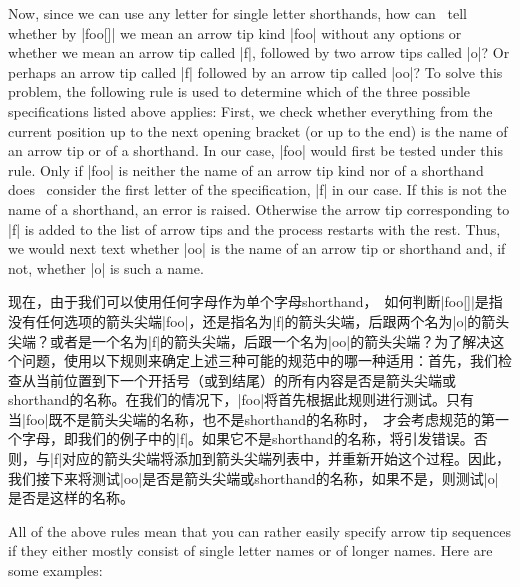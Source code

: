 Now, since we can use any letter for single letter shorthands, how can
\tikzname\ tell whether by |foo[]| we mean an arrow tip kind |foo| without any
options or whether we mean an arrow tip called |f|, followed by two arrow tips
called |o|? Or perhaps an arrow tip called |f| followed by an arrow tip called
|oo|? To solve this problem, the following rule is used to determine which of
the three possible specifications listed above applies: First, we check whether
everything from the current position up to the next opening bracket (or up to
the end) is the name of an arrow tip or of a shorthand. In our case, |foo|
would first be tested under this rule. Only if |foo| is neither the name of an
arrow tip kind nor of a shorthand does \tikzname\ consider the first letter of
the specification, |f| in our case. If this is not the name of a shorthand, an
error is raised. Otherwise the arrow tip corresponding to |f| is added to the
list of arrow tips and the process restarts with the rest. Thus, we would next
text whether |oo| is the name of an arrow tip or shorthand and, if not, whether
|o| is such a name.

现在，由于我们可以使用任何字母作为单个字母shorthand，\tikzname\ 如何判断|foo[]|是指没有任何选项的箭头尖端|foo|，还是指名为|f|的箭头尖端，后跟两个名为|o|的箭头尖端？或者是一个名为|f|的箭头尖端，后跟一个名为|oo|的箭头尖端？为了解决这个问题，使用以下规则来确定上述三种可能的规范中的哪一种适用：首先，我们检查从当前位置到下一个开括号（或到结尾）的所有内容是否是箭头尖端或shorthand的名称。在我们的情况下，|foo|将首先根据此规则进行测试。只有当|foo|既不是箭头尖端的名称，也不是shorthand的名称时，\tikzname\ 才会考虑规范的第一个字母，即我们的例子中的|f|。如果它不是shorthand的名称，将引发错误。否则，与|f|对应的箭头尖端将添加到箭头尖端列表中，并重新开始这个过程。因此，我们接下来将测试|oo|是否是箭头尖端或shorthand的名称，如果不是，则测试|o|是否是这样的名称。

All of the above rules mean that you can rather easily specify arrow tip
sequences if they either mostly consist of single letter names or of longer
names. Here are some examples:

